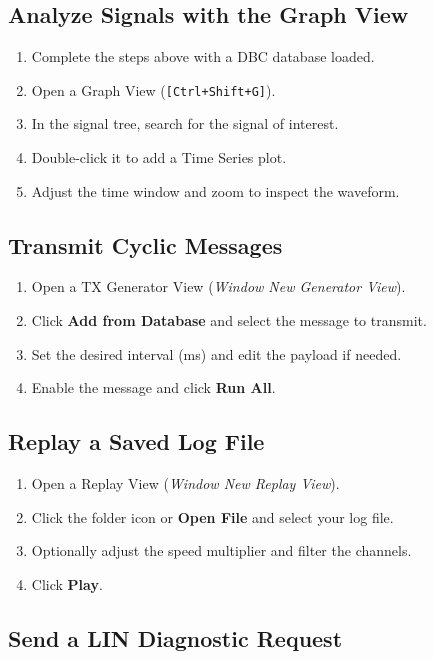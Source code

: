 \documentclass[a4paper,11pt]{article}
\newcommand{\key}[1]{\texttt{\small[#1]}}
\newcommand{\menu}[1]{\textit{#1}}
\newcommand{\ui}[1]{\textbf{#1}}
\begin{document}
\subsection{Analyze Signals with the Graph View}

\begin{enumerate}
  \item Complete the steps above with a DBC database loaded.
  \item Open a Graph View (\key{Ctrl+Shift+G}).
  \item In the signal tree, search for the signal of interest.
  \item Double-click it to add a Time Series plot.
  \item Adjust the time window and zoom to inspect the waveform.
\end{enumerate}

\subsection{Transmit Cyclic Messages}

\begin{enumerate}
  \item Open a TX Generator View (\menu{Window \textrightarrow{} New \textrightarrow{} Generator View}).
  \item Click \ui{Add from Database} and select the message to transmit.
  \item Set the desired interval (ms) and edit the payload if needed.
  \item Enable the message and click \ui{Run All}.
\end{enumerate}

\subsection{Replay a Saved Log File}

\begin{enumerate}
  \item Open a Replay View (\menu{Window \textrightarrow{} New \textrightarrow{} Replay View}).
  \item Click the folder icon or \ui{Open File} and select your log file.
  \item Optionally adjust the speed multiplier and filter the channels.
  \item Click \ui{Play}.
\end{enumerate}

\subsection{Send a LIN Diagnostic Request}
\end{document}
